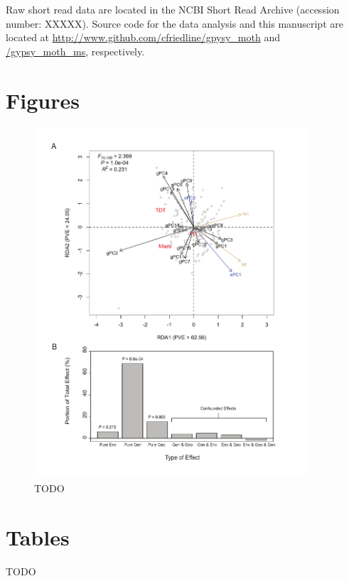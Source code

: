 \documentclass[smallextended]{svjour3}
\newcommand{\beginsupplement}{%
        \setcounter{table}{0}
        \renewcommand{\thetable}{S\arabic{table}}
        \setcounter{figure}{0}
        \renewcommand{\thefigure}{S\arabic{figure}}
        \renewcommand{\thesection}{S\arabic{section}}
        \renewcommand{\thesubsection}{S\arabic{subsection}}
     }
\begin{document}
Raw short read data are located in the NCBI Short Read Archive (accession
number: XXXXX). Source code for the data analysis and this manuscript are
located at
\url{http://www.github.com/cfriedline/gpysy_moth} and \url{/gypsy_moth_ms},
respectively.

\clearpage



\clearpage


\section*{Figures}
\begin{figure}[ht]
\centering
\includegraphics[width=0.9\textwidth]{rda_fig}
\caption{TODO}
\label{fig:rda}
\end{figure}

\clearpage

\section*{Tables}
TODO


\clearpage


\beginsupplement%
\end{document}
